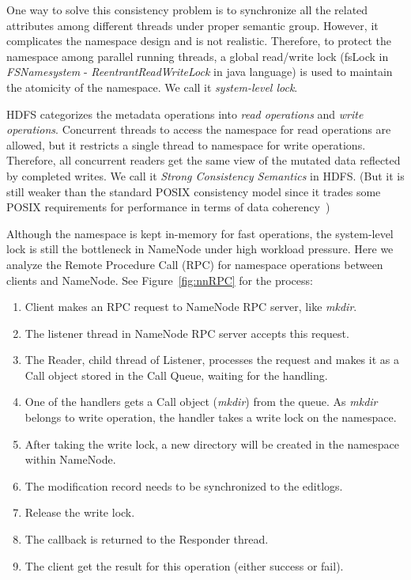 \noindent One way to solve this consistency problem is to synchronize all the related attributes among different threads under proper semantic group. However, it complicates the namespace design and is not realistic. Therefore, to protect the namespace among parallel running threads, a global read/write lock (fsLock in \textit{FSNamesystem} - \textit{ReentrantReadWriteLock} in java language) is used to maintain the atomicity of the namespace. We call it \textit{system-level lock}.

\noindent HDFS categorizes the metadata operations into \textit{read operations} and \textit{write operations}. Concurrent threads to access the namespace for read operations are allowed, but it restricts a single thread to namespace for write operations. Therefore, all concurrent readers get the same view of the mutated data reflected by completed writes. We call it \textit{Strong Consistency Semantics} in HDFS. (But it is still weaker than the standard POSIX consistency model since it trades some POSIX requirements for performance in terms of data coherency~\cite{white2012hadoop})

\noindent Although the namespace is kept in-memory for fast operations, the system-level lock is still the bottleneck in NameNode under high workload pressure. Here we analyze the Remote Procedure Call (RPC) for namespace operations between clients and NameNode. See Figure~\ref{fig:nnRPC} for the process:

\begin{enumerate}[noitemsep]
	\item Client makes an RPC request to NameNode RPC server, like \textit{mkdir}.
	\item The listener thread in NameNode RPC server accepts this request.
	\item The Reader, child thread of Listener, processes the request and makes it as a Call object stored in the Call Queue, waiting for the handling.
	\item One of the handlers gets a Call object (\textit{mkdir}) from the queue. As \textit{mkdir} belongs to write operation, the handler takes a write lock on the namespace.
	\item After taking the write lock, a new directory will be created in the namespace within NameNode.
	\item The modification record needs to be synchronized to the editlogs.
	\item Release the write lock.
	\item The callback is returned to the Responder thread.
	\item The client get the result for this operation (either success or fail).
\end{enumerate}

